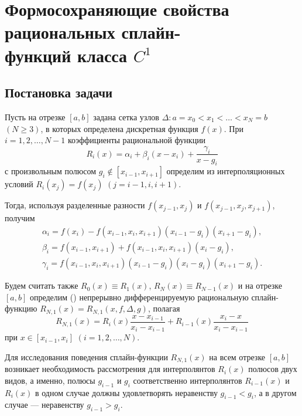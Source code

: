 
\chapter{Формосохраняющие свойства рациональных сплайн-\\функций класса $C^1$}%
\section{Постановка задачи}

Пусть на отрезке $[a,b]$ задана сетка узлов
$\Delta: a=x_0<x_1<\dots<x_N=b$ $(N\geqslant 3)$,
в которых определена дискретная функция $f(x)$. При $i=1,2,\dots,N-1$ коэффициенты
рациональной функции
\begin{equation}\label{ark-1.1}
R_i(x)=\alpha_i+\beta_i (x-x_i)+\frac{\gamma_i}{x-g_i}
\end{equation}
с произвольным полюсом $g_i\not \in [x_{i-1},x_{i+1}]$ определим из интерполяционных условий
$R_i(x_j)=f(x_j)$ $(j=i-1,i,i+1)$.

Тогда, используя разделенные разности $f(x_{j-1}, x_j)$ и $f(x_{j-1}, x_j, x_{j+1})$, получим
\begin{equation}
\begin{array}{l}
\alpha_i=f(x_i)-f(x_{i-1}, x_i, x_{i+1})(x_{i-1}-g_i)(x_{i+1}-g_i),\\
\beta_i=f(x_{i-1}, x_{i+1})+f(x_{i-1}, x_i, x_{i+1})(x_i-g_i),\\
\gamma_i=f(x_{i-1}, x_i, x_{i+1})(x_{i-1}-g_i)(x_i-g_i)(x_{i+1}-g_i).
\end{array}\label{ark-1.2}
\end{equation}

Будем считать также $R_0(x)\equiv R_1(x)$, $R_N(x)\equiv R_{N-1}(x)$ и на отрезке $[a,b]$
определим (\cite{ark-12}) непрерывно дифференцируемую рациональную сплайн-функцию
$R_{N,1}(x)=R_{N,1} (x, f, \Delta, g)$, полагая
\begin{equation}\label{ark-1.3}
R_{N,1}(x)=R_i(x)\frac{x-x_{i-1}}{x_i-x_{i-1}}+R_{i-1} (x)\frac{x_i-x}{x_i-x_{i-1}}
\end{equation}
при $x\in[x_{i-1},x_i]$ $(i=1,2,\dots,N)$.

Для исследования поведения сплайн-функции $R_{N,1}(x)$  на всем отрезке $[a,b]$ возникает
необходимость рассмотрения  для интерполянтов $R_i(x)$ полюсов  двух видов, а именно,
полюсы $g_{i-1}$ и $g_i$ соответственно интерполянтов
$R_{i-1} (x)$ и $R_i(x)$ в одном случае должны удовлетворять неравенству $g_{i-1}<g_i$,
 а в другом случае --- неравенству $g_{i-1}>g_i$.

